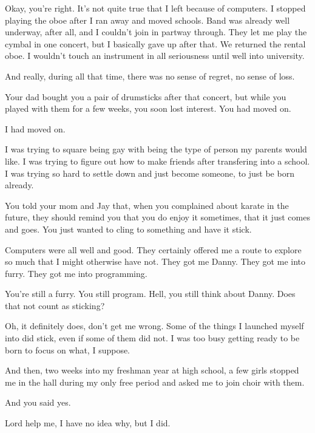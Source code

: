 \begin{leftcolumn}

Okay, you're right. It's not quite true that I left because of computers. I stopped playing the oboe after I ran away and moved schools. Band was already well underway, after all, and I couldn't join in partway through. They let me play the cymbal in one concert, but I basically gave up after that. We returned the rental oboe. I wouldn't touch an instrument in all seriousness until well into university.

And really, during all that time, there was no sense of regret, no sense of loss.

\begin{ally}
Your dad bought you a pair of drumsticks after that concert, but while you played with them for a few weeks, you soon lost interest. You had moved on.
\end{ally}
I had moved on.

I was trying to square being gay with being the type of person my parents would like. I was trying to figure out how to make friends after transfering into a school. I was trying so hard to settle down and just become someone, to just be born already.

\begin{ally}
You told your mom and Jay that, when you complained about karate in the future, they should remind you that you do enjoy it sometimes, that it just comes and goes. You just wanted to cling to something and have it stick.
\end{ally}
Computers were all well and good. They certainly offered me a route to explore so much that I might otherwise have not. They got me Danny. They got me into furry. They got me into programming.

\begin{ally}
You're still a furry. You still program. Hell, you still think about Danny. Does that not count as sticking?
\end{ally}
Oh, it definitely does, don't get me wrong. Some of the things I launched myself into did stick, even if some of them did not. I was too busy getting ready to be born to focus on what, I suppose.

And then, two weeks into my freshman year at high school, a few girls stopped me in the hall during my only free period and asked me to join choir with them.

\begin{ally}
And you said yes.
\end{ally}
Lord help me, I have no idea why, but I did.
\newpage
\end{leftcolumn}
